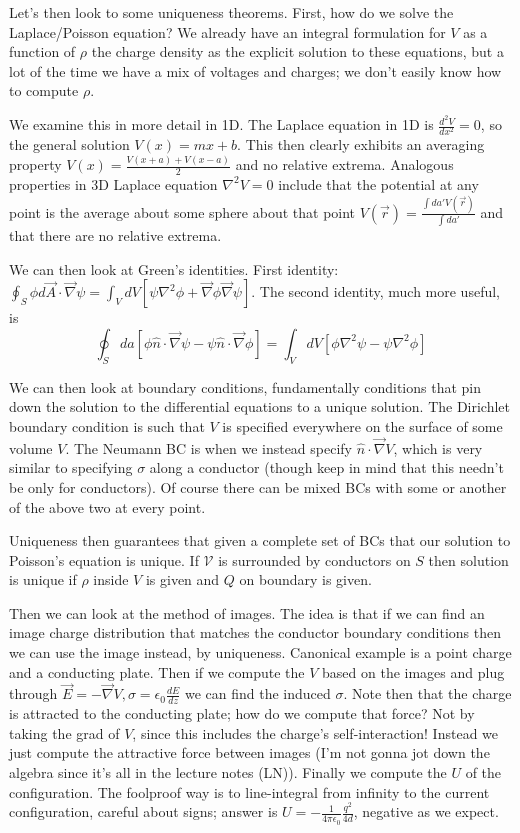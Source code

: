 \documentclass[10pt]{report}
\newcommand{\rd}[2]{\frac{d#1}{d#2}}
\newcommand{\rtd}[2]{\frac{d^2#1}{d#2^2}}
\newcommand{\grad}[0]{\vec{\nabla}}
\begin{document}
Let's then look to some uniqueness theorems. First, how do we solve the Laplace/Poisson equation? We already have an integral formulation for $V$ as a function of $\rho$ the charge density as the explicit solution to these equations, but a lot of the time we have a mix of voltages and charges; we don't easily know how to compute $\rho$. 

We examine this in more detail in 1D. The Laplace equation in 1D is $\rtd{V}{x} = 0$, so the general solution $V(x) = mx + b$. This then clearly exhibits an averaging property $V(x) = \frac{V(x+a) + V(x-a)}{2}$ and no relative extrema. Analogous properties in 3D Laplace equation $\nabla^2 V = 0$ include that the potential at any point is the average about some sphere about that point $V(\vec{r}) = \frac{\int da'V(\vec{r})}{\int da'}$ and that there are no relative extrema.

We can then look at Green's identities. First identity: $\oint_S \phi d\vec{A}\cdot \grad \psi = \int_V dV\left[ \psi\nabla^2 \phi + \grad \phi\grad \psi \right]$. The second identity, much more useful, is
\begin{equation}
    \oint_S da\left[ \phi\hat{n}\cdot \grad \psi - \psi\hat{n}\cdot \grad \phi \right] = \int_V dV\left[ \phi\nabla^2 \psi - \psi\nabla^2 \phi \right]
\end{equation}

We can then look at boundary conditions, fundamentally conditions that pin down the solution to the differential equations to a unique solution. The Dirichlet boundary condition is such that $V$ is specified everywhere on the surface of some volume $V$. The Neumann BC is when we instead specify $\hat{n}\cdot \grad V$, which is very similar to specifying $\sigma$ along a conductor (though keep in mind that this needn't be only for conductors). Of course there can be mixed BCs with some or another of the above two at every point.

Uniqueness then guarantees that given a complete set of BCs that our solution to Poisson's equation is unique. If $\mathcal{V}$ is surrounded by conductors on $S$ then solution is unique if $\rho$ inside $V$ is given and $Q$ on boundary is given.

Then we can look at the method of images. The idea is that if we can find an image charge distribution that matches the conductor boundary conditions then we can use the image instead, by uniqueness. Canonical example is a point charge and a conducting plate. Then if we compute the $V$ based on the images and plug through $\vec{E} = -\grad V, \sigma = \epsilon_0\rd{E}{z}$ we can find the induced $\sigma$. Note then that the charge is attracted to the conducting plate; how do we compute that force? Not by taking the grad of $V$, since this includes the charge's self-interaction! Instead we just compute the attractive force between images (I'm not gonna jot down the algebra since it's all in the lecture notes (LN)). Finally we compute the $U$ of the configuration. The foolproof way is to line-integral from infinity to the current configuration, careful about signs; answer is $U = -\frac{1}{4\pi\epsilon_0}\frac{q^2}{4d}$, negative as we expect. 
\end{document}
